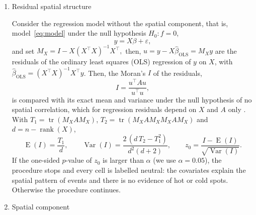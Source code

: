 \begin{enumerate}[label=Step \arabic*:]
\item Residual spatial structure \label{sec:gate}%

Consider the regression model without the spatial component, that is, model~\eqref{eq:model} under the null hypothesis $H_0\!: f=0$,
\begin{equation}\label{eq:regresion}
   y = X\beta + \varepsilon,
\end{equation}
and set 
$
M_X = I - X(X^\top X)^{-1}X^\top,
$ then,
$
  u = y - X\hat\beta_{\mathrm{OLS}} = M_X y
$
are the residuals of the ordinary least squares (OLS) regression of $y$ on $X$, with $\hat\beta_{\mathrm{OLS}}=(X^\top X)^{-1}X^\top y$. 
Then, the Moran's $I$ of the residuals,
\begin{equation}\label{eq:moran}
  I = \frac{u^\top A u}{u^\top u},
\end{equation}
is compared with its exact mean and variance under the null hypothesis of no spatial correlation, which for regression residuals depend on $X$ and $A$ only \citep{tg07}. With $T_1=\operatorname{tr}(M_XAM_X)$, $T_2=\operatorname{tr}(M_XAM_XM_XAM_X)$ and $d=n-\operatorname{rank}(X)$,
\begin{equation}\label{eq:moran-moments}
  \operatorname{E}(I)=\frac{T_1}{d}, \qquad
  \operatorname{Var}(I)=\frac{2\,(d\,T_2-T_1^2)}{d^2(d+2)}, \qquad
  z_0=\frac{I-\operatorname{E}(I)}{\sqrt{\operatorname{Var}(I)}} .
\end{equation}
If the one-sided $p$-value of $z_0$ is larger than $\alpha$ (we use $\alpha=0.05$), the procedure stops and every cell is labelled neutral: the covariates explain the spatial pattern of events and there is no evidence of hot or cold spots. Otherwise the procedure continues.

\item Spatial component \label{sec:esf}



\end{enumerate}
